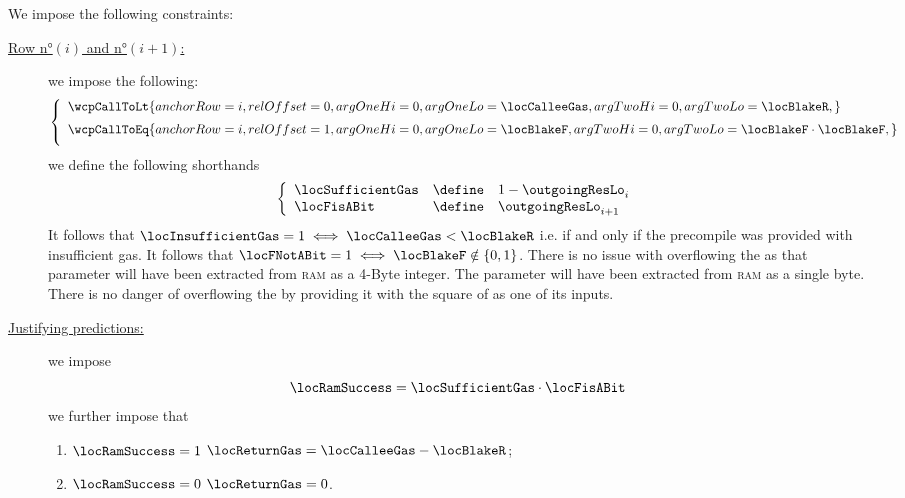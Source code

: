We impose the following constraints:
\begin{description}
	\item[\underline{Row n°$(i)$ and n°$(i + 1)$:}] we impose the following:
	      \[
		      \left\{ \begin{array}{l}
			      \wcpCallToLt {
				      anchorRow = i             ,
				      relOffset = 0             ,
				      argOneHi  = 0             ,
				      argOneLo  = \locCalleeGas ,
				      argTwoHi  = 0             ,
				      argTwoLo  = \locBlakeR    ,
			      }
			      \vspace{2mm} \\
			      \wcpCallToEq {
				      anchorRow = i                           ,
				      relOffset = 1                           ,
				      argOneHi  = 0                           ,
				      argOneLo  = \locBlakeF                  ,
				      argTwoHi  = 0                           ,
				      argTwoLo  = \locBlakeF \cdot \locBlakeF ,
			      }
			      \vspace{2mm} \\
		      \end{array} \right.
	      \]
	      we define the following shorthands
	      \[
		      \left\{ \begin{array}{lcl}
			      \locSufficientGas & \define & 1 - \outgoingResLo _{i} \\
			      \locFisABit       & \define & \outgoingResLo _{i + 1} \\
		      \end{array} \right.
	      \]
	      It follows that $\locInsufficientGas = 1 \iff \locCalleeGas < \locBlakeR$ i.e. if and only if the  precompile was provided with insufficient gas.
	      It follows that $\locFNotABit = 1 \iff \locBlakeF \notin \{0, 1\}$.
	      \saNote{} There is no issue with \locBlakeR{} overflowing the \wcpMod{} as that parameter will have been extracted from \textsc{ram} as a 4-Byte integer.
	      \saNote{} The parameter \locBlakeF{} will have been extracted from \textsc{ram} as a single byte. There is no danger of overflowing the \wcpMod{} by providing it with the square of \locBlakeF{} as one of its inputs.
	\item[\underline{Justifying \hubMod{} predictions:}]
	      we impose
	      \[
		      \locRamSuccess = \locSufficientGas \cdot \locFisABit
	      \]
	      we further impose that
	      \begin{enumerate}
		      \item \If $\locRamSuccess = 1$ \Then \( \locReturnGas = \locCalleeGas - \locBlakeR \);
		      \item \If $\locRamSuccess = 0$ \Then \( \locReturnGas = 0 \).
	      \end{enumerate}
\end{description}
